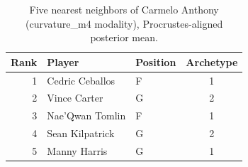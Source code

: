 \begin{table}[htbp]
  \centering\small
  \begin{tabular}{rllc}
    \toprule
    Rank & Player & Position & Archetype \\
    \midrule
    1 & Cedric Ceballos & F & 1 \\
    2 & Vince Carter & G & 2 \\
    3 & Nae'Qwan Tomlin & F & 1 \\
    4 & Sean Kilpatrick & G & 2 \\
    5 & Manny Harris & G & 1 \\
    \bottomrule
  \end{tabular}
  \caption{Five nearest neighbors of Carmelo Anthony (curvature_m4 modality), Procrustes-aligned posterior mean.}
  \label{tab:Carmelo_Anthony_neighbors_curvature_m4}
\end{table}


